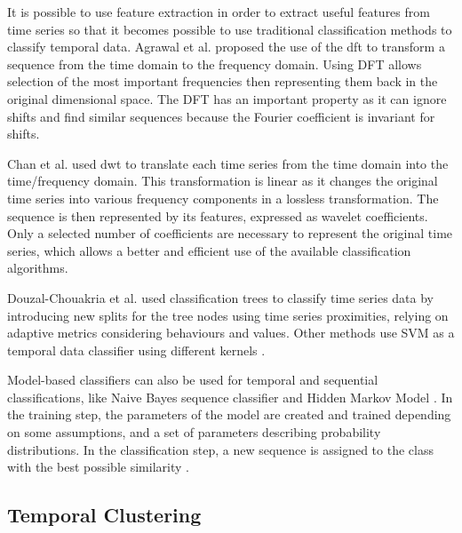 It is possible to use feature extraction in order to extract useful features from time series so that it becomes possible to use traditional classification methods to classify temporal data. Agrawal et al. \cite{Agrawal1993a} proposed the use of the \acrfull{dft} to transform a sequence from the time domain to the frequency domain. Using DFT allows selection of the most important frequencies then representing them back in the original dimensional space. The DFT has an important property as it can ignore shifts and find similar sequences because the Fourier coefficient is invariant for shifts.


Chan et al. \cite{Chan1999} used \acrfull{dwt} to translate each time series from the time domain into the time/frequency domain. This transformation is linear as it changes the original time series into various frequency components in a lossless transformation. The sequence is then represented by its features, expressed as wavelet coefficients. Only a selected number of coefficients are necessary to represent the original time series, which allows a better and efficient use of the available classification algorithms.


Douzal-Chouakria et al. \cite{Douzal-Chouakria2012} used classification trees to classify time series data by introducing new splits for the tree nodes using time series proximities, relying on adaptive metrics considering behaviours and values. Other methods use SVM as a temporal data classifier using different kernels \cite{Sitaram2007}.

Model-based classifiers can also be used for temporal and sequential classifications, like Naive Bayes sequence classifier \cite{Tseng2009} and Hidden Markov Model \cite{Oates1999}. In the training step, the parameters of the model are created and trained depending on some assumptions, and a set of parameters describing probability distributions. In the classification step, a new sequence is assigned to the class with the best possible similarity \cite{Xing2010}.

\subsection{Temporal Clustering}





